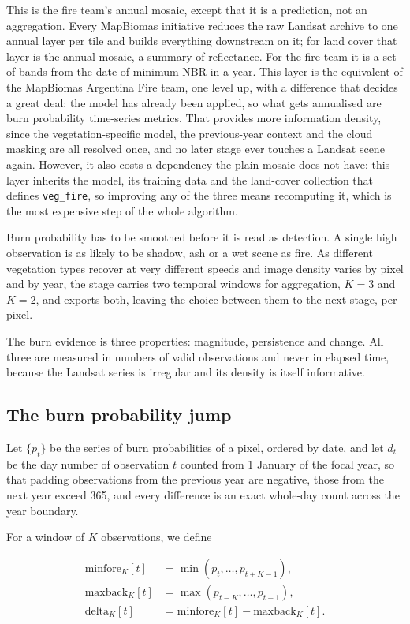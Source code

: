 \documentclass[11pt,a4paper]{article}
\begin{document}
This is the fire team's annual mosaic, except that it is a prediction, not an aggregation. Every
MapBiomas initiative reduces the raw Landsat archive to one annual layer per tile and builds
everything downstream on it; for land cover that layer is the annual mosaic, a summary of
reflectance. For the fire team it is a set of bands from the date of minimum NBR in a year.
This layer is the equivalent of the MapBiomas Argentina Fire team, 
one level up, with a difference that decides a
great deal: the model has already been applied, so what gets annualised are burn probability time-series metrics.
That provides more information density, 
since the vegetation-specific model, the previous-year context and the
cloud masking are all resolved once, and no later stage ever touches a Landsat scene again. 
However, it
also costs a dependency the plain mosaic does not have: this layer inherits the model, its
training data and the land-cover collection that defines \texttt{veg\_fire}, so improving any of
the three means recomputing it, which is the most expensive step of the whole
algorithm.

Burn probability has to be smoothed before it is read as detection. A single high observation is
as likely to be shadow, ash or a wet scene as fire. 
As different vegetation types recover at very different speeds and image density varies by
pixel and by year, the stage carries two temporal windows for aggregation, \(K=3\) and \(K=2\), 
and exports both, leaving the choice between them to the next stage, per pixel.

The burn evidence is three properties: magnitude, persistence and change. All three are measured in numbers
of valid observations and never in elapsed time, because the Landsat series is irregular and its
density is itself informative.

\subsection{The burn probability jump}

Let \(\{p_t\}\) be the series of burn probabilities of a pixel, ordered by date, and let \(d_t\) be
the day number of observation \(t\) counted from 1 January of the focal year, so that padding
observations from the previous year are negative, those from the next year exceed 365, and every
difference is an exact whole-day count across the year boundary.

For a window of \(K\) observations, we define

\begin{equation}
  \label{eq-delta}
  \begin{aligned}
    \mathrm{minfore}_K[t] &= \min\left(p_t, \dots, p_{t+K-1}\right), \\
    \mathrm{maxback}_K[t] &= \max\left(p_{t-K}, \dots, p_{t-1}\right), \\
    \mathrm{delta}_K[t]   &= \mathrm{minfore}_K[t] - \mathrm{maxback}_K[t].
  \end{aligned}
\end{equation}
\end{document}
